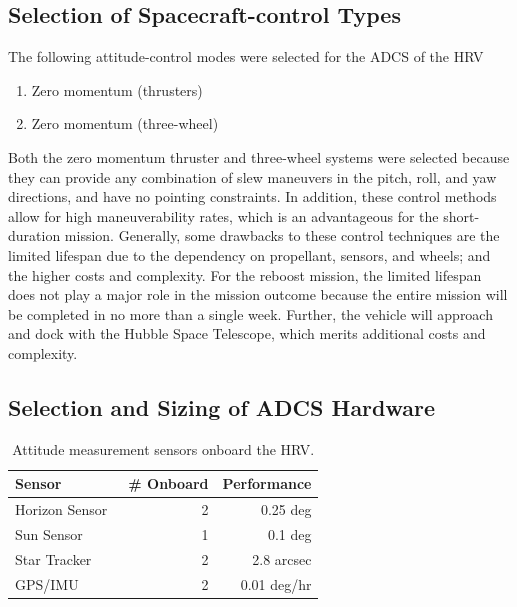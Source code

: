 \documentclass[paper=letter, fontsize=11pt]{scrartcl} %
\numberwithin{equation}{section} %
\numberwithin{figure}{section} %
\numberwithin{table}{section} %
\begin{document}
\subsection{Selection of Spacecraft-control Types}
The following attitude-control modes were selected for the ADCS of the HRV
\begin{enumerate}
\item Zero momentum (thrusters)
\item Zero momentum (three-wheel)
\end{enumerate}

\par Both the zero momentum thruster and three-wheel systems were selected because they can provide any combination of slew maneuvers in the pitch, roll, and yaw directions, and have no pointing constraints. In addition, these control methods allow for high maneuverability rates, which is an advantageous for the short-duration mission. Generally, some drawbacks to these control techniques are the limited lifespan due to the dependency on propellant, sensors, and wheels; and the higher costs and complexity. For the reboost mission, the limited lifespan does not play a major role in the mission outcome because the entire mission will be completed in no more than a single week. Further, the vehicle will approach and dock with the Hubble Space Telescope, which merits additional costs and complexity.

\subsection{Selection and Sizing of ADCS Hardware}
\begin{table}[H]
\begin{center}
\begin{tabular}{l r r}
\toprule
Sensor & \# Onboard & Performance \\
\midrule
Horizon Sensor~\cite{earth_sensor} & 2 & 0.25 deg \\
Sun Sensor~\cite{sun_sensor}     & 1 & 0.1 deg \\
Star Tracker~\cite{star_tracker}   & 2 & 2.8 arcsec \\
GPS/IMU~\cite{gps_ins}        & 2 & 0.01 deg/hr \\
\bottomrule
\end{tabular}
\end{center}
\caption{Attitude measurement sensors onboard the HRV.}
\end{table}
\end{document}
